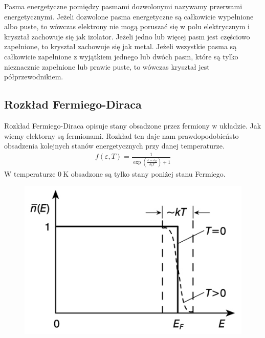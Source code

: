 \documentclass[paper=a4, fontsize=12pt]{scrartcl}
\begin{document}
Pasma energetyczne pomiędzy pasmami dozwolonymi nazywamy przerwami energetycznymi. Jeżeli dozwolone pasma energetyczne są całkowicie wypełnione albo puste, to wówczas elektrony nie mogą poruszać się w polu elektrycznym i kryształ zachowuje się jak izolator. Jeżeli jedno lub więcej pasm jest częściowo zapełnione, to kryształ zachowuje się  jak metal. Jeżeli wszystkie pasma są całkowicie zapełnione z wyjątkiem jednego lub dwóch 
pasm, które są tylko nieznacznie zapełnione lub prawie puste, to wówczas kryształ jest półprzewodnikiem. 
\subsection{Rozkład Fermiego-Diraca}
Rozkład Fermiego-Diraca opisuje stany obsadzone przez fermiony w układzie. Jak wiemy elektorny są fermionami. Rozkład ten daje nam prawdopodobieństo obsadzenia kolejnych stanów energetycznych przy danej temperaturze.
\begin{align*}
	f(\varepsilon,T)=\frac{1}{\exp\left(\frac{\varepsilon-\varepsilon_F}{k_bT}\right)+1}
\end{align*}
W temperaturze $0\:\mathrm{K}$ obsadzone są tylko stany poniżej stanu Fermiego.
\begin{figure}[h!]
\centering
\includegraphics[width=0.5\linewidth]{d82i2792}
\label{fig:d82i2792}
\end{figure}
\end{document}

